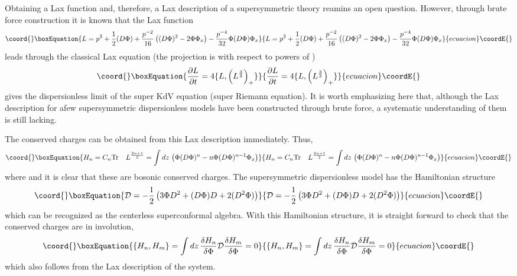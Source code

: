 \documentclass[a4paper,11pt]{article}
\begin{document}
Obtaining a Lax function and, therefore, a Lax description of a
supersymmetric theory reamins an open question. However, through brute
force construction it is known that the Lax function
\begin{equation}\coord{}\boxEquation{
L = p^{2} + {1\over 2} (D\Phi) + {p^{-2}\over 16} \left((D\Phi)^{2} -
2\Phi \Phi_{x}\right) - {p^{-4}\over 32} \Phi (D\Phi) \Phi_{x}
}{
L = p^{2} + {1\over 2} (D\Phi) + {p^{-2}\over 16} \left((D\Phi)^{2} -
2\Phi \Phi_{x}\right) - {p^{-4}\over 32} \Phi (D\Phi) \Phi_{x}
}{ecuacion}\coordE{}\end{equation}
leads through the classical Lax equation (the projection is with
respect to powers of \coordHE{})
\begin{equation}\coord{}\boxEquation{
{\partial L\over \partial t} = 4 \{L , \left(L^{3\over 2}\right)_{+}\}
}{
{\partial L\over \partial t} = 4 \{L , \left(L^{3\over 2}\right)_{+}\}
}{ecuacion}\coordE{}\end{equation}
gives the dispersionless limit of the super KdV equation (super
Riemann equation). It is worth emphasizing here that, although the Lax
description for afew supersymmetric dispersionless models have been
constructed through brute force, a systematic understanding of them is
still lacking.

The conserved charges can be obtained from this Lax description
immediately. Thus,
\begin{equation}\coord{}\boxEquation{
H_{n} = C_{n} {\rm Tr}\quad L^{2n+1\over 2} = \int
dz\,\left(\Phi(D\Phi)^{n} - n\Phi (D\Phi)^{n-1} \Phi_{x}\right)
}{
H_{n} = C_{n} {\rm Tr}\quad L^{2n+1\over 2} = \int
dz\,\left(\Phi(D\Phi)^{n} - n\Phi (D\Phi)^{n-1} \Phi_{x}\right)
}{ecuacion}\coordE{}\end{equation}
where \coordHE{} and it is clear that these are bosonic
conserved charges. The supersymmetric dispersionless model has the
Hamiltonian structure
\begin{equation}\coord{}\boxEquation{
{\cal D} = -{1\over 2} \left(3 \Phi D^{2} + (D\Phi) D + 2
(D^{2}\Phi)\right)
}{
{\cal D} = -{1\over 2} \left(3 \Phi D^{2} + (D\Phi) D + 2
(D^{2}\Phi)\right)
}{ecuacion}\coordE{}\end{equation}
which can be recognized as the centerless superconformal algebra. With
this Hamiltonian structure, it is straight forward to check that the
conserved charges are in involution,
\begin{equation}\coord{}\boxEquation{
\{H_{n},H_{m}\} = \int dz\,{\delta H_{n}\over \delta \Phi} {\cal D}
{\delta H_{m}\over \delta \Phi} = 0
}{
\{H_{n},H_{m}\} = \int dz\,{\delta H_{n}\over \delta \Phi} {\cal D}
{\delta H_{m}\over \delta \Phi} = 0
}{ecuacion}\coordE{}\end{equation}
which also follows from the Lax description of the system.
\end{document}
